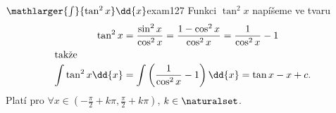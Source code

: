 \begin{mathexam}{\(\mathlarger{\int}{\tan^2x}\dd{x}\)\hfill\cite[s.~30]{Knichal}}{exam127}
  Funkci \(\tan^2x\) napíšeme ve tvaru 
  \begin{align*}
    \tan^2x &= \frac{\sin^2x}{\cos^2x}=\frac{1-\cos^2x}{\cos^2x} = \frac{1}{\cos^2x}-1   \\
    \shortintertext{takže}
    \int{\tan^2x}\dd{x} &= \int\left(\frac{1}{\cos^2x}-1\right)\dd{x} = \tan x - x + c.  
  \end{align*}  
  Platí pro \(\forall x\in\left(-\frac{\pi}{2}+k\pi, \frac{\pi}{2}+k\pi\right)\),
  \(k\in\naturalset\).
\end{mathexam}